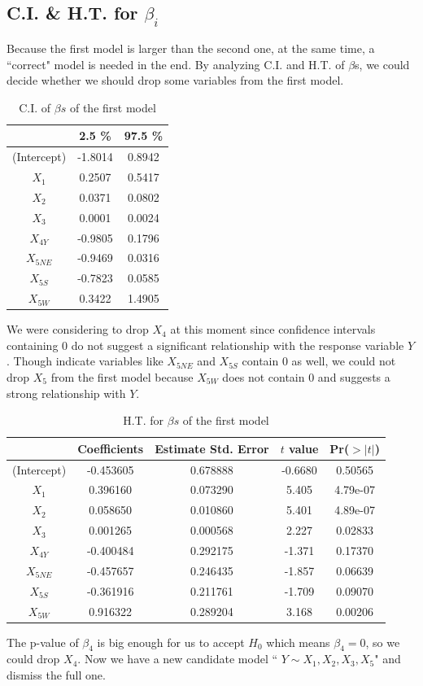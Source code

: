 \documentclass[a4paper,11pt,onecolumn,twoside]{article}
\begin{document}
\subsection{C.I. \& H.T. for $\beta_i$}
Because the first model is larger than the second one, at the same time, a ``correct" model is needed in the end. By analyzing C.I. and H.T. of $\beta$s, we could decide whether we should drop some variables from the first model.
\begin{table}[H]
	\centering
	\begin{tabular}{ccc}
		\midrule[1.5pt]
		& 2.5 \% &97.5 \% \\
		\hline
		(Intercept) &-1.8014 &0.8942\\
		$X_1$         &  0.2507 &0.5417\\
		$X_2$           &0.0371 &0.0802\\
		$X_3$           &0.0001 &0.0024\\
		$X_{4Y}$         &-0.9805 &0.1796\\
		$X_{5NE}$        &-0.9469 &0.0316\\
		$X_{5S}$         &-0.7823 &0.0585\\
		$X_{5W}$          &0.3422 &1.4905\\	
		\midrule[1.5pt]
	\end{tabular}
	\caption{C.I. of $\beta s$ of the first model }
\end{table}
We were considering to drop $X_4$ at this moment since confidence intervals containing 0 do not suggest a significant relationship with the response variable $Y$. Though indicate variables like $X_{5NE}$ and $X_{5S}$ contain 0 as well, we could not drop $X_5$ from the first model because $X_{5W}$ does not contain 0 and suggests a strong relationship with $Y$.
\begin{table}[H]
	\centering
	\begin{tabular}{ccccc}
		\midrule[1.5pt]	
		&Coefficients
		&Estimate Std. Error &$t$ value &Pr($>|t|$)\\
		\hline    
	  (Intercept) &-0.453605 &  0.678888 & -0.6680 &0.50565    \\
		$X_1$          & 0.396160  & 0.073290   &5.405 &4.79e-07\\
		$X_2$          & 0.058650  & 0.010860   &5.401 &4.89e-07\\
		$X_3$          & 0.001265   &0.000568   &2.227  &0.02833 \\
		$X_{4Y}$         &-0.400484   &0.292175  &-1.371  &0.17370  \\  
		$X_{5NE}$        &-0.457657  & 0.246435  &-1.857  &0.06639 \\
		$X_{5S}$         &-0.361916   &0.211761  &-1.709  &0.09070 \\
		$X_{5W}$         & 0.916322   &0.289204   &3.168  &0.00206 \\
		\midrule[1.5pt]
	\end{tabular}
	\caption{H.T. for $\beta s$ of the first model }
\end{table}
The p-value of $\beta_4$ is big enough for us to accept $H_0$ which means $\beta_4=0$, so we could drop $X_4$. Now we have a new candidate model `` $Y \sim X_1,X_2,X_3,X_5$" and dismiss the full one.
\end{document}
